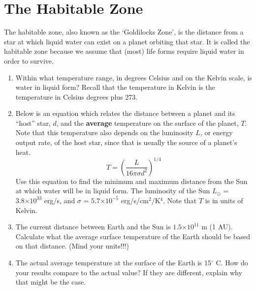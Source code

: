 \documentclass[12pt]{article}
\providecommand{\e}[1]{\ensuremath{\times 10^{#1}}} %
\begin{document}
\medskip

\section{The Habitable Zone}

The habitable zone, also known as the `Goldilocks Zone', is the distance from a star at which liquid water can exist on a planet orbiting that star.  
It is called the habitable zone because we assume that (most) life forms require liquid water in order to survive.

\begin{enumerate}

\item Within what temperature range, in degrees Celsius and on the Kelvin scale, is water in liquid form?  
Recall that the temperature in Kelvin is the temperature in Celsius degrees plus 273.  %

\item Below is an equation which relates the distance between a planet and its ``host'' star, $d$, and the \textbf{average} temperature on the surface of the planet, $T$. 
Note that this temperature also depends on the luminosity %
$L$, or energy output rate, of the host star, since that is usually the source of a planet's heat.
$$ T = \left( \frac{L}{16 \pi \sigma d^{2}} \right) ^{1/4} $$
Use this equation to find the minimum and maximum distance from the Sun at which water will be in liquid form.  
The luminosity of the Sun $L_{\odot}$ = $3.8 \e{33}$ erg/s, and $\sigma$ = $5.7 \e{-5}$ erg/s/cm$^{2}$/K$^{4}$.  
Note that $T$ is in units of Kelvin.  


\item The current distance between Earth and the Sun is $1.5 \e{11}$ m (1 AU).  
Calculate what the average surface temperature of the Earth should be based on that distance.  (Mind your units!!!)


\item The actual average temperature at the surface of the Earth is 15$^{\circ}$ C.  
How do your results compare to the actual value?  
If they are different, explain why that might be the case.


\end{enumerate}
\end{document}
